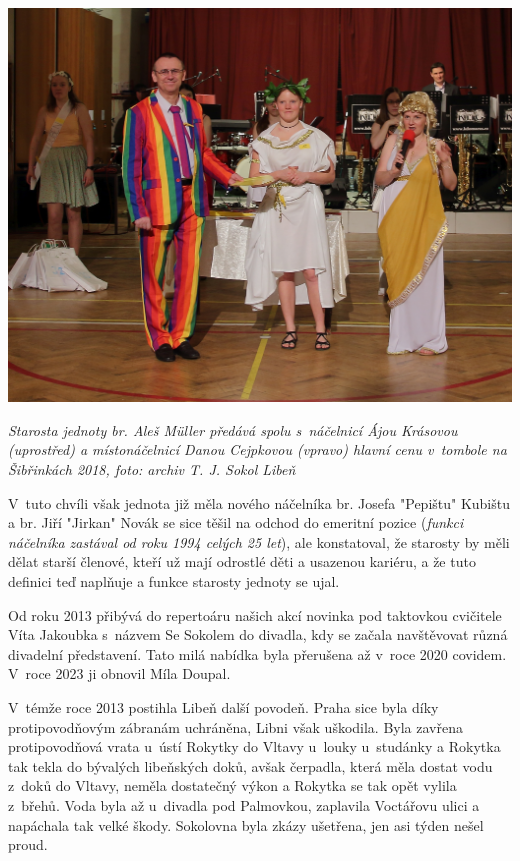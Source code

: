 \documentclass[a5paper, 11pt, twoside]{article}
\begin{document}
 \includegraphics[width=\textwidth]{img/63_ales.jpg}

\textit{Starosta jednoty br. Aleš Müller předává spolu s~náčelnicí Ájou
Krásovou (uprostřed) a místonáčelnicí Danou Cejpkovou (vpravo) hlavní
cenu v~tombole na Šibřinkách 2018, foto: archiv T. J. Sokol Libeň}

V~tuto chvíli však jednota již měla nového náčelníka br. Josefa
"Pepištu" Kubištu a br. Jiří "Jirkan" Novák se sice těšil na odchod do
emeritní pozice (\textit{funkci náčelníka zastával od roku 1994 celých 25
let}), ale konstatoval, že starosty by měli dělat starší členové, kteří
už mají odrostlé děti a usazenou kariéru, a že tuto definici teď
naplňuje a funkce starosty jednoty se ujal.

Od roku 2013 přibývá do repertoáru našich akcí novinka pod taktovkou
cvičitele Víta Jakoubka s~názvem Se Sokolem do divadla, kdy se začala
navštěvovat různá divadelní představení. Tato milá nabídka byla
přerušena až v~roce 2020 covidem. V~roce 2023 ji obnovil Míla Doupal.

V~témže roce 2013 postihla Libeň další povodeň. Praha sice byla díky
protipovodňovým zábranám uchráněna, Libni však uškodila. Byla zavřena
protipovodňová vrata u~ústí Rokytky do Vltavy u~louky u~studánky a
Rokytka tak tekla do bývalých libeňských doků, avšak čerpadla, která
měla dostat vodu z~doků do Vltavy, neměla dostatečný výkon a Rokytka se
tak opět vylila z~břehů. Voda byla až u~divadla pod Palmovkou, zaplavila
Voctářovu ulici a napáchala tak velké škody. Sokolovna byla zkázy
ušetřena, jen asi týden nešel proud.
\end{document}
